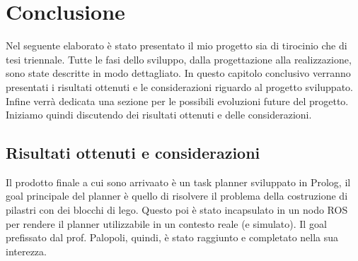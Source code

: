 \chapter{Conclusione}
\label{cha:conclusione}
Nel seguente elaborato è stato presentato il mio progetto sia di tirocinio che di tesi triennale. Tutte le fasi dello sviluppo, dalla progettazione alla realizzazione, sono state descritte in modo dettagliato.
In questo capitolo conclusivo verranno presentati i risultati ottenuti e le considerazioni riguardo al progetto sviluppato. Infine verrà dedicata una sezione per le possibili evoluzioni future del progetto.
Iniziamo quindi discutendo dei risultati ottenuti e delle considerazioni.

\section{Risultati ottenuti e considerazioni}
\label{sec:risultati}
Il prodotto finale a cui sono arrivaato è un task planner sviluppato in Prolog, il goal principale del planner è quello di risolvere il problema della costruzione di pilastri con dei blocchi di lego.
Questo poi è stato incapsulato in un nodo ROS per rendere il planner utilizzabile in un contesto reale (e simulato). 
Il goal prefissato dal prof. Palopoli, quindi, è stato raggiunto e completato nella sua interezza.

